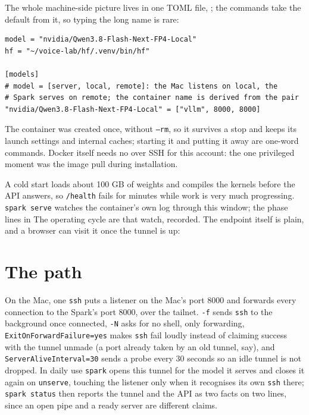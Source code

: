 \documentclass[11pt,a4paper]{article}
\newcommand{\home}{\textasciitilde}  %
\begin{document}
The whole machine-side picture lives in one TOML file, \name{\home/.config/spark/config.toml}; the commands take the default from it, so typing the long name is rare:

\begin{lstlisting}[style=out]
model = "nvidia/Qwen3.8-Flash-Next-FP4-Local"
hf = "~/voice-lab/hf/.venv/bin/hf"

[models]
# model = [server, local, remote]: the Mac listens on local, the
# Spark serves on remote; the container name is derived from the pair
"nvidia/Qwen3.8-Flash-Next-FP4-Local" = ["vllm", 8000, 8000]
\end{lstlisting}

The container was created once, without \texttt{--rm}, so it survives a stop and keeps its launch settings and internal caches; starting it and putting it away are one-word commands. Docker itself needs no  over SSH for this account: the one privileged moment was the image pull during installation.

\begin{tcolorbox}[enhanced, breakable, colback=white, opacityback=1, colframe=black!40, boxrule=0.5pt, arc=1pt, title={First start takes minutes}, colbacktitle=black!6, coltitle=black, fonttitle=\small\bfseries]
A cold start loads about 100 GB of weights and compiles the  kernels before the API answers, so \texttt{/health} fails for minutes while work is very much progressing. \texttt{spark serve} watches the container's own log through this window; the phase lines in The operating cycle are that watch, recorded. The endpoint itself is plain, and a browser can visit it once the tunnel is up:


\end{tcolorbox}

\section{The path}
\label{sec:path}

On the Mac, one \texttt{ssh} puts a listener on the Mac's port 8000 and forwards every connection to the Spark's port 8000, over the tailnet. \texttt{-f} sends \texttt{ssh} to the background once connected, \texttt{-N} asks for no shell, only forwarding, \texttt{ExitOnForwardFailure=yes} makes \texttt{ssh} fail loudly instead of claiming success with the tunnel unmade (a port already taken by an old tunnel, say), and \texttt{ServerAliveInterval=30} sends a probe every 30 seconds so an idle tunnel is not dropped. In daily use \texttt{spark} opens this tunnel for the model it serves and closes it again on \texttt{unserve}, touching the listener only when it recognises its own \texttt{ssh} there; \texttt{spark status} then reports the tunnel and the API as two facts on two lines, since an open pipe and a ready server are different claims.
\end{document}
